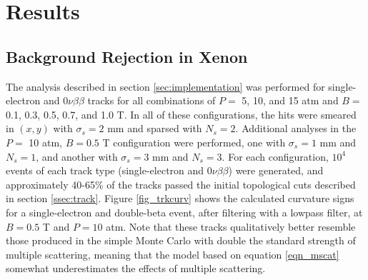 \documentclass{JINST}
\begin{document}
\section{Results}\label{sec:results}
\subsection{Background Rejection in Xenon}
The analysis described in section \ref{sec:implementation} was performed for single-electron and
$0\nu\beta\beta$ tracks for all combinations of $P =$ 5, 10, and 15 atm and $B =$ 0.1, 0.3, 0.5, 0.7, 
and 1.0 T.  In all of these configurations, the hits were smeared in $(x,y)$ with $\sigma_{s} = 2$ mm and 
sparsed with $N_{s} = 2$.  Additional analyses in the $P =$ 10 atm, $B = 0.5$ T configuration were performed, 
one with $\sigma_{s} = 1$ mm and $N_{s} = 1$, and another with $\sigma_{s} = 3$ mm and $N_{s} = 3$.  For 
each configuration, $10^4$ events of each track type (single-electron and $0\nu\beta\beta$) were generated, 
and approximately 40-65\% of the tracks passed the initial topological cuts described in section 
\ref{ssec:track}.  Figure \ref{fig_trkcurv} shows the calculated curvature signs for a single-electron and double-beta event, after filtering with a lowpass filter, at $B = 0.5$ T and $P = 10$ atm.  Note that these tracks
qualitatively better resemble those produced in the simple Monte Carlo with double the standard strength of 
multiple scattering, meaning that the model based on equation \ref{eqn_mscat} somewhat underestimates the 
effects of multiple scattering.
\end{document}

